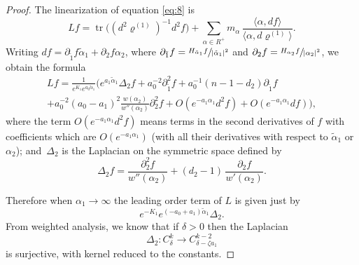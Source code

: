\documentclass[JEP,XML,SOM,Unicode, NoEqCountersInSection, NoFloatCountersInSection]{cedram}
\theoremstyle{plain}
\theoremstyle{definition}
\DeclareMathOperator{\tr}{tr}
\newcommand{\ta}{\tilde \alpha}
\newcommand{\rRoots}{R}
\newcommand{\rhoun}{\varrho^{(1)}}
\begin{document}
\begin{proof}
The linearization of equation \eqref{eq:8} is
\begin{equation}
Lf = \tr\big( (d^2\rhoun)^{-1}d^2f \big) + \sum_{\alpha\in \rRoots^+}m_\alpha\, \frac{\langle\alpha,df\rangle}{\langle\alpha,d\rhoun\rangle}.
\end{equation}
Writing $df=\partial_{\tilde 1}f \ta_1 + \partial_2f \alpha_2$, where $\partial_{\tilde 1}f=\sfrac{H_{\ta_1}f }{|\ta_1|^2}$ and $\partial_2f=\sfrac{H_{\alpha_2}f}{|\alpha_2|^2}$,
we obtain the formula
\begin{multline}
\label{eq:10}
Lf = \frac1{e^{K_1}e^{a_0\ta_1}} \Big( e^{a_1\ta_1} \Delta_2f +
a_0^{-2} \partial_{\tilde 1}^2f + a_0^{-1} (n-1-d_2) \partial_{\tilde 1}f \\ +
a_0^{-2}(a_0-a_1)^2\frac{w(\alpha_2)}{w''(\alpha_2)}\partial_2^2f
+ O(e^{-a_1\alpha_1}d^2f) + O(e^{-a_1\alpha_1}df) \Big),
\end{multline}
where the term $O(e^{-a_1\alpha_1}d^2f)$ means terms in the second derivatives of $f$ with coefficients which are $O(e^{-a_1\alpha_1})$ (with all their derivatives with respect to $\ta_1$ or $\alpha_2$); and~$\Delta_2$ is the Laplacian on the symmetric space defined by
\begin{equation}
\Delta_2f = \frac{\partial_2^2f}{w''(\alpha_2)} + (d_2-1)\, \frac{\partial_2f}{w'(\alpha_2)}.
\end{equation}

Therefore when $\alpha_1\to\infty$ the leading order term of $L$ is given just by
\[ e^{-K_1}e^{(-a_0+a_1)\ta_1}\Delta_2. \]
From weighted analysis, we know that if $\delta>0$ then the Laplacian
\[ \Delta_2 : C^k_\delta \longrightarrow C^{k-2}_{\delta-\zeta a_1} \]
is surjective, with kernel reduced to the constants.


\end{proof}
\end{document}
